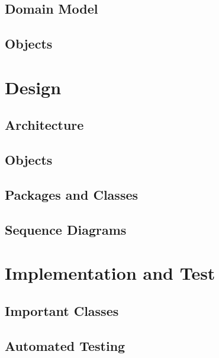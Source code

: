 \documentclass[a4paper,parskip=full]{scrreprt}
\begin{document}
\section{Domain Model}

\section{Objects}


\chapter{Design}

\section{Architecture}

\section{Objects}

\section{Packages and Classes}

\section{Sequence Diagrams}


\chapter{Implementation and Test}

\section{Important Classes}

\section{Automated Testing}
\end{document}
